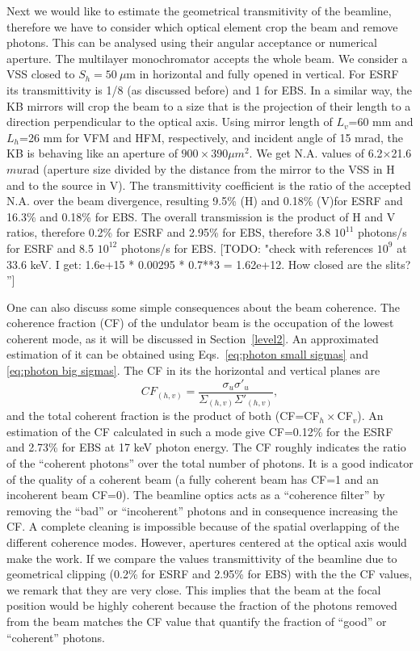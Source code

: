 \documentclass{iucr}              %
\newcommand{\todo}[1]{{\color{red}[TODO: "#1'']}}
\begin{document}
Next we would like to estimate the geometrical transmitivity of the beamline, therefore we have to consider which optical element crop the beam and remove photons. This can be analysed using their angular acceptance or numerical aperture. The multilayer monochromator accepts the whole beam. We consider a VSS closed to $S_h=50~\mu$m in horizontal and fully opened in vertical. For ESRF its transmittivity is 1/8 (as discussed before) and 1 for EBS. In a similar way, the KB mirrors will crop the beam to a size that is the projection of their length to a direction perpendicular to the optical axis. Using mirror length of $L_v$=60 mm and $L_h$=26 mm for VFM and HFM, respectively, and incident angle of 15 mrad, the KB is behaving like an aperture of $900 \times 390 \mu m^2$. We get N.A. values of 6.2$\times$21.6 $mu$rad (aperture size divided by the distance from the mirror to the VSS in H and to the source in V). The transmittivity coefficient is the ratio of the accepted N.A. over the beam divergence, resulting 9.5\% (H) and 0.18\% (V)for ESRF and 16.3\% and 0.18\% for EBS. The overall transmission is the product of H and V ratios, therefore 0.2\% for ESRF and 2.95\% for EBS, therefore 3.8 $10^{11}$ photons/s for ESRF and 8.5 $10^{12}$ photons/s for EBS. 
\todo{check with references $10^9$ at 33.6 keV. I get: 1.6e+15 * 0.00295 * 0.7**3 = 1.62e+12. How closed are the slits? }

One can also discuss some simple consequences about the beam coherence. The coherence fraction (CF) \cite{arxivCF} of the undulator beam is the occupation of the lowest coherent mode, as it will be discussed in Section~\ref{level2}. An approximated estimation of it can be obtained using Eqs.~\ref{eq:photon small sigmas} and \ref{eq:photon big sigmas}. The CF in its the horizontal and vertical planes are
\begin{equation}
 CF_{(h,v)} = \frac{\sigma_u \sigma'_u}{\Sigma_{(h,v)} \Sigma'_{(h,v)}},
\end{equation}
and the total coherent fraction is the product of both (CF=CF$_h \times $CF$_v$). An estimation of the CF calculated in such a mode give CF=0.12\% for the ESRF and 2.73\% for EBS at 17 keV photon energy. The CF roughly indicates the ratio of the ``coherent photons'' over the total number of photons. It is a good indicator of the quality of a coherent beam (a fully coherent beam has CF=1 and an incoherent beam CF=0). The beamline optics acts as a ``coherence filter'' by removing the ``bad'' or ``incoherent'' photons and in consequence increasing the CF. A complete cleaning is impossible because of the spatial overlapping of the different coherence modes. However, apertures centered at the optical axis would make the work. If we compare the values transmittivity of the beamline due to geometrical clipping  (0.2\% for ESRF and 2.95\% for EBS) with the the CF values, we remark that they are very close. This implies that the beam at the focal position would be highly coherent because the fraction of the photons removed from the beam matches the CF value that quantify the fraction of ``good'' or ``coherent'' photons. 
\end{document}

